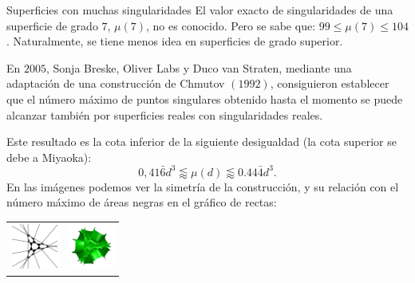 \begin{surferPage}{Superficies con muchas singularidades}
    El valor exacto de singularidades de una superficie de grado $7$, $\mu(7)$, no es conocido.
    Pero se sabe que: $99\le \mu(7) \le 104$. Naturalmente, se tiene menos idea en superficies de grado superior.
    
    En $2005$, Sonja Breske, Oliver Labs y Duco van Straten, mediante una adaptación de 
    una construcción de Chmutov $(1992)$, consiguieron establecer que el número máximo de puntos singulares
    obtenido hasta el momento se puede alcanzar también por superficies reales con singularidades reales.
    
    Este resultado es la cota inferior de la siguiente desigualdad (la cota superior se debe a Miyaoka):
    \[0,41\bar{6}d^3 \lessapprox \mu(d) \lessapprox 0.44\bar{4} d^3.\]
     En las imágenes podemos ver la simetría de la construcción, y su relación
     con el número máximo de áreas negras en el gráfico de rectas:
    \begin{center}
      \begin{tabular}{c@{\qquad}c}
        \includegraphics[height=1.5cm]{../../common/images/vielesing.pdf}
        &
        \includegraphics[height=1.5cm]{../../common/images/p9surface_von_oben}
      \end{tabular}
    \end{center}
\end{surferPage}
